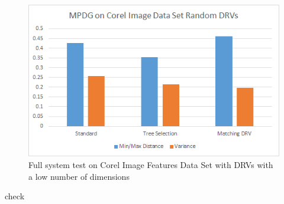 \begin{figure}[h]
\begin{center}
\includegraphics[width=.85\textwidth]{Figures/altext}
\end{center}
\caption{Full system test on Corel Image Features Data Set with DRVs with a low number of dimensions}
\label{fig:altext}
\end{figure}
check
